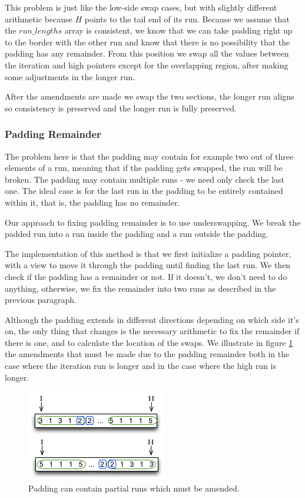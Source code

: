 This problem is just like the low-side swap cases, but with slightly different arithmetic because $H$ points to the tail end of its run. Because we assume that the $run\_lengths$ array is consistent, we know that we can take padding right up to the border with the other run and know that there is no possibility that the padding has any remainder. From this position we swap all the values between the iteration and high pointers except for the overlapping region, after making some adjustments in the longer run.

After the amendments are made we swap the two sections, the longer run aligns so consistency is preserved and the longer run is fully preserved.

\subsubsection{Padding Remainder}

The problem here is that the padding may contain for example two out of three elements of a run, meaning that if the padding gets swapped, the run will be broken. The padding may contain multiple runs - we need only check the last one. The ideal case is for the last run in the padding to be entirely contained within it, that is, the padding has no remainder.

Our approach to fixing padding remainder is to use underswapping. We break the padded run into a run inside the padding and a run outside the padding.

The implementation of this method is that we first initialize a padding pointer, with a view to move it through the padding until finding the last run. We then check if the padding has a remainder or not. If it doesn't, we don't need to do anything, otherwise, we fix the remainder into two runs as described in the previous paragraph.

Although the padding extends in different directions depending on which side it's on, the only thing that changes is the necessary arithmetic to fix the remainder if there is one, and to calculate the location of the swaps. We illustrate in figure \ref{fig:padding_remainder} the amendments that must be made due to the padding remainder both in the case where the iteration run is longer and in the case where the high run is longer. 

\begin{figure}[H]
  \centering
  \includegraphics[]{images/d22_padding_remainder}
  \caption{Padding can contain partial runs which must be amended.}
  \label{fig:padding_remainder}
\end{figure}

